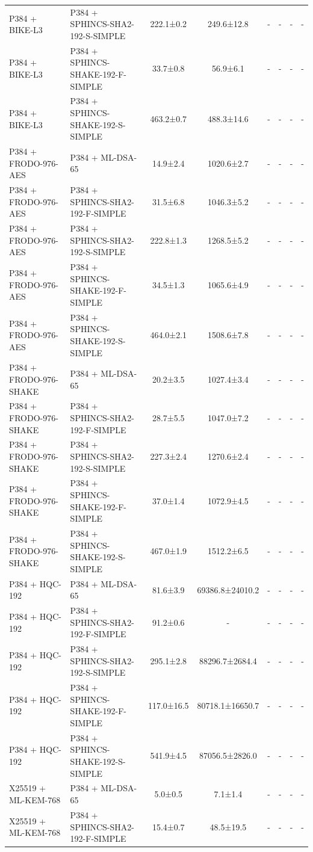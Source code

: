 \documentclass[10pt]{article}
\begin{document}
\begin{tabular}{@{}l l c c c c c c@{}}
P384 + BIKE-L3 & P384 + SPHINCS-SHA2-192-S-SIMPLE & 222.1±0.2 & 249.6±12.8 & - & - & - & - \\
P384 + BIKE-L3 & P384 + SPHINCS-SHAKE-192-F-SIMPLE & 33.7±0.8 & 56.9±6.1 & - & - & - & - \\
P384 + BIKE-L3 & P384 + SPHINCS-SHAKE-192-S-SIMPLE & 463.2±0.7 & 488.3±14.6 & - & - & - & - \\
P384 + FRODO-976-AES & P384 + ML-DSA-65 & 14.9±2.4 & 1020.6±2.7 & - & - & - & - \\
P384 + FRODO-976-AES & P384 + SPHINCS-SHA2-192-F-SIMPLE & 31.5±6.8 & 1046.3±5.2 & - & - & - & - \\
P384 + FRODO-976-AES & P384 + SPHINCS-SHA2-192-S-SIMPLE & 222.8±1.3 & 1268.5±5.2 & - & - & - & - \\
P384 + FRODO-976-AES & P384 + SPHINCS-SHAKE-192-F-SIMPLE & 34.5±1.3 & 1065.6±4.9 & - & - & - & - \\
P384 + FRODO-976-AES & P384 + SPHINCS-SHAKE-192-S-SIMPLE & 464.0±2.1 & 1508.6±7.8 & - & - & - & - \\
P384 + FRODO-976-SHAKE & P384 + ML-DSA-65 & 20.2±3.5 & 1027.4±3.4 & - & - & - & - \\
P384 + FRODO-976-SHAKE & P384 + SPHINCS-SHA2-192-F-SIMPLE & 28.7±5.5 & 1047.0±7.2 & - & - & - & - \\
P384 + FRODO-976-SHAKE & P384 + SPHINCS-SHA2-192-S-SIMPLE & 227.3±2.4 & 1270.6±2.4 & - & - & - & - \\
P384 + FRODO-976-SHAKE & P384 + SPHINCS-SHAKE-192-F-SIMPLE & 37.0±1.4 & 1072.9±4.5 & - & - & - & - \\
P384 + FRODO-976-SHAKE & P384 + SPHINCS-SHAKE-192-S-SIMPLE & 467.0±1.9 & 1512.2±6.5 & - & - & - & - \\
P384 + HQC-192 & P384 + ML-DSA-65 & 81.6±3.9 & 69386.8±24010.2 & - & - & - & - \\
P384 + HQC-192 & P384 + SPHINCS-SHA2-192-F-SIMPLE & 91.2±0.6 & - & - & - & - & - \\
P384 + HQC-192 & P384 + SPHINCS-SHA2-192-S-SIMPLE & 295.1±2.8 & 88296.7±2684.4 & - & - & - & - \\
P384 + HQC-192 & P384 + SPHINCS-SHAKE-192-F-SIMPLE & 117.0±16.5 & 80718.1±16650.7 & - & - & - & - \\
P384 + HQC-192 & P384 + SPHINCS-SHAKE-192-S-SIMPLE & 541.9±4.5 & 87056.5±2826.0 & - & - & - & - \\
X25519 + ML-KEM-768 & P384 + ML-DSA-65 & 5.0±0.5 & 7.1±1.4 & - & - & - & - \\
X25519 + ML-KEM-768 & P384 + SPHINCS-SHA2-192-F-SIMPLE & 15.4±0.7 & 48.5±19.5 & - & - & - & - \\

\end{tabular}
\end{document}
